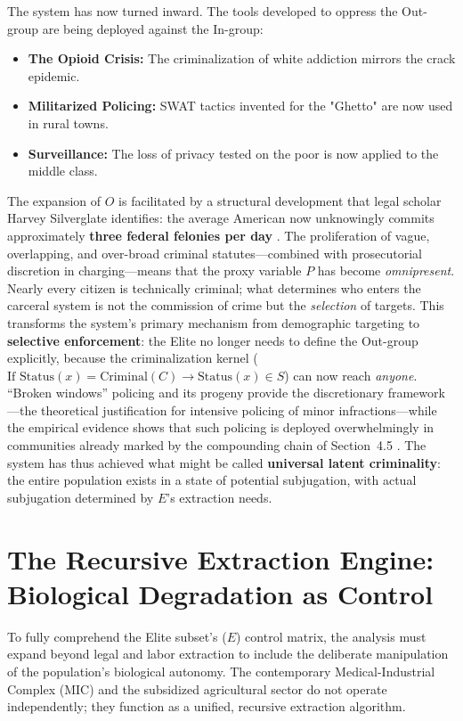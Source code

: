 \documentclass[12pt,openany]{book}
\begin{document}
The system has now turned inward. The tools developed to oppress the Out-group are being deployed against the In-group:
\begin{itemize}
    \item \textbf{The Opioid Crisis:} The criminalization of white addiction mirrors the crack epidemic.
    \item \textbf{Militarized Policing:} SWAT tactics invented for the "Ghetto" are now used in rural towns.
    \item \textbf{Surveillance:} The loss of privacy tested on the poor is now applied to the middle class.
\end{itemize}

The expansion of $O$ is facilitated by a structural development that legal scholar Harvey Silverglate identifies: the average American now unknowingly commits approximately \textbf{three federal felonies per day} \cite{silverglate}. The proliferation of vague, overlapping, and over-broad criminal statutes---combined with prosecutorial discretion in charging---means that the proxy variable $P$ has become \textit{omnipresent}. Nearly every citizen is technically criminal; what determines who enters the carceral system is not the commission of crime but the \textit{selection} of targets. This transforms the system's primary mechanism from demographic targeting to \textbf{selective enforcement}: the Elite no longer needs to define the Out-group explicitly, because the criminalization kernel ($\text{If } \text{Status}(x) = \text{Criminal}(C) \rightarrow \text{Status}(x) \in S$) can now reach \textit{anyone}. ``Broken windows'' policing \cite{wilson} and its progeny provide the discretionary framework---the theoretical justification for intensive policing of minor infractions---while the empirical evidence shows that such policing is deployed overwhelmingly in communities already marked by the compounding chain of Section~4.5 \cite{harcourt}. The system has thus achieved what might be called \textbf{universal latent criminality}: the entire population exists in a state of potential subjugation, with actual subjugation determined by $E$'s extraction needs.

\section{The Recursive Extraction Engine: Biological Degradation as Control}

To fully comprehend the Elite subset’s ($E$) control matrix, the analysis must expand beyond legal and labor extraction to include the deliberate manipulation of the population's biological autonomy. The contemporary Medical-Industrial Complex (MIC) and the subsidized agricultural sector do not operate independently; they function as a unified, recursive extraction algorithm.
\end{document}
